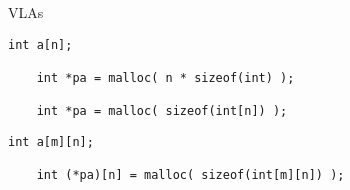 \begin{frame}{}
  \centerline{\LARGE VLAs}
\end{frame}

\begin{frame}[fragile]{}
  \begin{lstlisting}[style = Cstyle]
    int a[n];

    int *pa = malloc( n * sizeof(int) );

    int *pa = malloc( sizeof(int[n]) );
  \end{lstlisting}
\end{frame}

\begin{frame}[fragile]{}
  \begin{lstlisting}[style = Cstyle]
    int a[m][n];

    int (*pa)[n] = malloc( sizeof(int[m][n]) );
  \end{lstlisting}
\end{frame}
